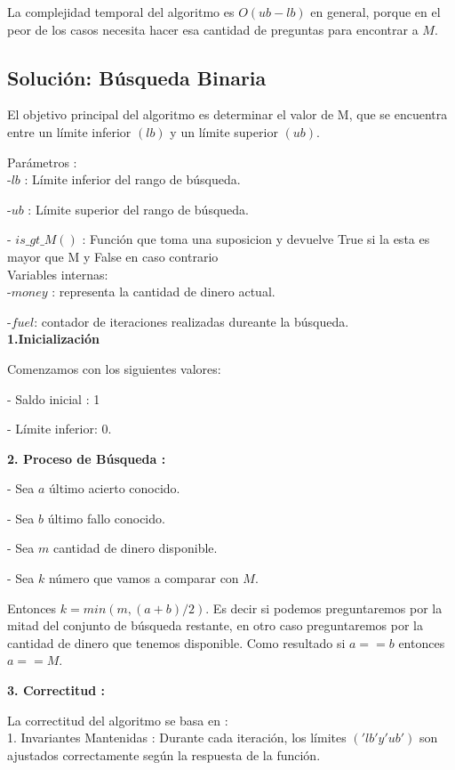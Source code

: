 \documentclass[
10pt, %
a4paper, %
oneside, %
headinclude,footinclude, %
BCOR5mm, %
]{scrartcl}
\begin{document}
La complejidad temporal del algoritmo es $O (ub-lb)$ en general, porque en el peor de los casos necesita hacer
esa cantidad de preguntas para encontrar a $M$.

\subsection{Solución: Búsqueda Binaria}
El objetivo principal del algoritmo es determinar el valor de M, que se encuentra entre un límite inferior $(lb)$ y un límite superior $(ub)$. 

Parámetros :\\

-$lb$ : Límite inferior del rango de búsqueda.


-$ub$ : Límite superior del rango de búsqueda.


- $is\_gt\_M()$ : Función que toma una suposicion y devuelve True si la esta es mayor que M y False en caso contrario\\

Variables internas: \\

-$money$ : representa la cantidad de dinero actual.

-$fuel$: contador de iteraciones realizadas dureante la búsqueda. \\

\textbf{1.Inicialización}
 
Comenzamos con los siguientes valores:

- Saldo inicial : 1


- Límite inferior: 0.

\textbf{2. Proceso de Búsqueda :} 

- Sea $a$ último acierto conocido.

- Sea $b$ último fallo conocido.

- Sea $m$ cantidad de dinero disponible.

- Sea $k$ número que vamos a comparar 
con $M$.


Entonces $k = min(m, (a+b)/2)$. Es 
decir si podemos preguntaremos por la 
mitad del conjunto de búsqueda 
restante, en otro caso preguntaremos 
por la cantidad de dinero que tenemos 
disponible. Como resultado si $a == b$ 
entonces $a == M$.


\textbf{3. Correctitud :} 

La correctitud del algoritmo se basa en : \\

1. Invariantes Mantenidas : Durante cada iteración, los límites $('lb' y 'ub')$ son ajustados correctamente según la respuesta de la función.\\
\end{document}
